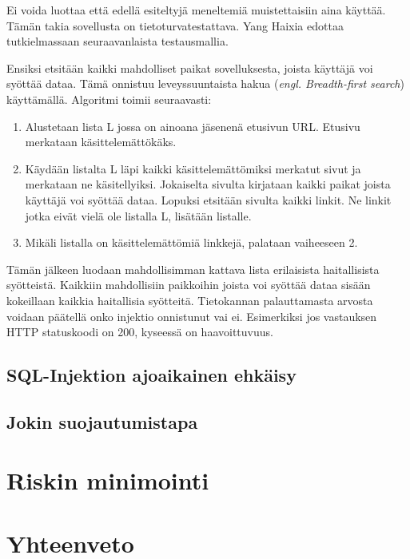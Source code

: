 \documentclass[finnish]{tktltiki2}
\theoremstyle{definition}
\theoremstyle{remark}
\begin{document}
Ei voida luottaa että edellä esiteltyjä meneltemiä muistettaisiin aina käyttää. Tämän takia sovellusta on tietoturvatestattava. Yang Haixia edottaa tutkielmassaan \cite{testing} seuraavanlaista testausmallia.

Ensiksi etsitään kaikki mahdolliset paikat sovelluksesta, joista käyttäjä voi syöttää dataa. Tämä onnistuu leveyssuuntaista hakua (\textit{engl. Breadth-first search}) käyttämällä. Algoritmi toimii seuraavasti:
\begin{enumerate}
\item Alustetaan lista L jossa on ainoana jäsenenä etusivun URL. Etusivu merkataan käsittelemättökäks.

\item Käydään listalta L läpi kaikki käsittelemättömiksi merkatut sivut ja merkataan ne käsitellyiksi. Jokaiselta sivulta kirjataan kaikki paikat joista käyttäjä voi syöttää dataa. Lopuksi etsitään sivulta kaikki linkit. Ne linkit jotka eivät vielä ole listalla L, lisätään listalle.

\item Mikäli listalla on käsittelemättömiä linkkejä, palataan vaiheeseen 2.
\end{enumerate}

Tämän jälkeen luodaan mahdollisimman kattava lista erilaisista haitallisista syötteistä. Kaikkiin mahdollisiin paikkoihin joista voi syöttää dataa sisään kokeillaan kaikkia haitallisia syötteitä. Tietokannan palauttamasta arvosta voidaan päätellä onko injektio onnistunut vai ei. Esimerkiksi jos vastauksen HTTP statuskoodi on 200, kyseessä on haavoittuvuus.

\pagebreak
\subsection{SQL-Injektion ajoaikainen ehkäisy}
\subsection {Jokin suojautumistapa}
\section {Riskin minimointi}
\section {Yhteenveto}




%
%
% 
%







% 
\end{document}
